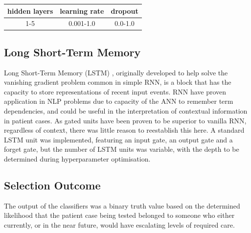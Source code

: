 \begin{table}[htbp]
\begin{center}
\begin{tabular}{@{}llc@{}}
\toprule
\textbf{hidden layers}  & \textbf{learning rate}        & \multicolumn{1}{r}{\textbf{dropout}} \\ \midrule
\multicolumn{1}{c}{1-5} & \multicolumn{1}{c}{0.001-1.0} & 0.0-1.0                              \\ \bottomrule
\end{tabular}
\end{center}

\end{table}


\subsection{Long Short-Term Memory}
\label{LSTM}

Long Short-Term Memory (LSTM) \cite{gers1999learning}, originally developed to help solve the vanishing gradient problem common in simple RNN, is a block that has the capacity to store representations of recent input events. RNN have proven application in NLP problems due to capacity of the ANN to remember term dependencies, and could be useful in the interpretation of contextual information in patient cases. As gated units have been proven to be superior to vanilla RNN, regardless of context, there was little reason to reestablish this here. A standard LSTM unit was implemented, featuring an input gate, an output gate and a forget gate, but the number of LSTM units was variable, with the depth to be determined during hyperparameter optimisation.   



\subsection{Selection Outcome}
\label{section-hyperparameter-results}

The output of the classifiers was a binary truth value based on the determined likelihood that the patient case being tested belonged to someone who either currently, or in the near future, would have escalating levels of required care. %

